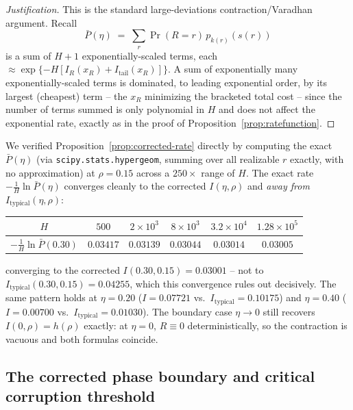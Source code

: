 \documentclass[11pt]{article}
\newcommand{\toprule}{\hline\hline}
\newcommand{\midrule}{\hline}
\newcommand{\bottomrule}{\hline\hline}
\begin{document}
\begin{proof}[Justification]
This is the standard large-deviations contraction/Varadhan argument. Recall
\[
\bar P(\eta) \;=\; \sum_r \Pr(R=r)\,p_{k(r)}(s(r))
\]
is a sum of $H{+}1$ exponentially-scaled terms, each
$\approx\exp\{-H[I_R(x_R)+I_{\mathrm{tail}}(x_R)]\}$. A sum of exponentially many
exponentially-scaled terms is dominated, to leading exponential order, by its largest (cheapest)
term -- the $x_R$ minimizing the bracketed total cost -- since the number of terms summed is only
polynomial in $H$ and does not affect the exponential rate, exactly as in the proof of
Proposition~\ref{prop:ratefunction}.
\end{proof}

We verified Proposition~\ref{prop:corrected-rate} directly by computing the exact $\bar P(\eta)$
(via \texttt{scipy.stats.\allowbreak hypergeom}, summing over all realizable $r$ exactly, with no
approximation) at $\rho=0.15$ across a $250\times$ range of $H$. The exact rate
$-\tfrac1H\ln\bar P(\eta)$ converges cleanly to the corrected $I(\eta,\rho)$ and \emph{away from}
$I_{\mathrm{typical}}(\eta,\rho)$:

\begin{center}
\begin{tabular}{cccccc}
\toprule
$H$ & $500$ & $2{\times}10^3$ & $8{\times}10^3$ & $3.2{\times}10^4$ & $1.28{\times}10^5$ \\
\midrule
$-\tfrac1H\ln\bar P(0.30)$ & $0.03417$ & $0.03139$ & $0.03044$ & $0.03014$ & $0.03005$ \\
\bottomrule
\end{tabular}
\end{center}
\noindent converging to the corrected $I(0.30,0.15)=0.03001$ -- not to
$I_{\mathrm{typical}}(0.30,0.15)=0.04255$, which this convergence rules out decisively. The same
pattern holds at $\eta=0.20$ ($I=0.07721$ vs.\ $I_{\mathrm{typical}}=0.10175$) and $\eta=0.40$
($I=0.00700$ vs.\ $I_{\mathrm{typical}}=0.01030$). The boundary case $\eta\to0$ still recovers
$I(0,\rho)=h(\rho)$ exactly: at $\eta=0$, $R\equiv0$ deterministically, so the contraction is
vacuous and both formulas coincide.

\subsection{The corrected phase boundary and critical corruption threshold}
\end{document}
